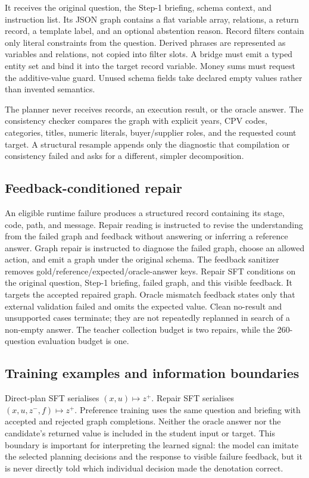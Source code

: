 It receives the original question, the Step-1 briefing, schema context, and instruction list.
Its JSON graph contains a flat variable array, relations, a return record, a template label, and an
optional abstention reason.  Record filters contain only literal constraints from the question.
Derived phrases are represented as variables and relations, not copied into filter slots.  A
bridge must emit a typed entity set and bind it into the target record variable.  Money sums must
request the additive-value guard.  Unused schema fields take declared empty values rather than
invented semantics.

The planner never receives records, an execution result, or the oracle answer.  The consistency
checker compares the graph with explicit years, CPV codes, categories, titles, numeric literals,
buyer/supplier roles, and the requested count target.  A structural resample appends only the
diagnostic that compilation or consistency failed and asks for a different, simpler decomposition.

\subsection{Feedback-conditioned repair}

An eligible runtime failure produces a structured record containing its stage, code, path, and
message.  Repair reading is instructed to revise the understanding from the failed graph and
feedback without answering or inferring a reference answer.  Graph repair is instructed to
diagnose the failed graph, choose an allowed action, and emit a graph under the original schema.
The feedback sanitizer removes gold/reference/expected/oracle-answer keys.  Repair SFT conditions
on the original question, Step-1 briefing, failed graph, and this visible feedback.  It targets the
accepted repaired graph.  Oracle mismatch feedback states only that external validation failed and
omits the expected value.  Clean no-result and unsupported cases terminate; they are not repeatedly
replanned in search of a non-empty answer.  The teacher collection budget is two repairs, while the
260-question evaluation budget is one.

\subsection{Training examples and information boundaries}

Direct-plan SFT serialises $(x,u)\mapsto z^+$.  Repair SFT serialises
$(x,u,z^-,f)\mapsto z^+$.  Preference training uses the same question and briefing with accepted
and rejected graph completions.  Neither the oracle answer nor the candidate's returned value is
included in the student input or target.  This boundary is important for interpreting the learned
signal: the model can imitate the selected planning decisions and the response to visible failure
feedback, but it is never directly told which individual decision made the denotation correct.

